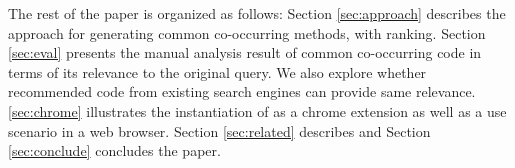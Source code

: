 The rest of the paper is organized as follows: Section
\ref{sec:approach} describes the approach for generating
common co-occurring methods, with ranking. Section \ref{sec:eval} presents the manual analysis result of common co-occurring code in terms of its relevance to the original query. We also explore whether recommended code from  existing search engines can provide same relevance. \ref{sec:chrome} illustrates the instantiation of {\tool} as a chrome extension as well as a use scenario in a web browser. Section \ref{sec:related} describes and Section \ref{sec:conclude} concludes the paper.
